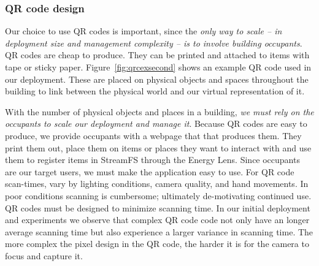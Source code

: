 




\subsubsection{QR code design}
\label{sec:qrc}
Our choice to use QR codes is important, since the \emph{only way to scale -- in deployment size and management complexity -- is to
involve building occupants}. QR codes are cheap to produce.  They can be printed and attached to items with tape or sticky paper.  
Figure~\ref{fig:qrcexsecond} shows an example QR code used in our deployment.  These are placed on physical
objects and spaces throughout the building to link between the physical world and our virtual representation of it.

With the number of physical objects and places in a building, \emph{we must rely on the occupants
to scale our deployment and manage it}. Because QR codes are easy to produce, we provide occupants with a webpage that
that produces them.  They print them out, place them on items or places they want to interact with and use them to register
items in StreamFS through the Energy Lens.
Since occupants are our target users, we must make the application easy to use.  For QR code scan-times, vary by lighting conditions, 
camera quality, and hand movements.  In poor conditions scanning is cumbersome; ultimately de-motivating continued use.  
QR codes must be designed to minimize scanning time.  In our initial deployment and experiments we observe
that complex QR code code not only have an longer average scanning time but also experience a larger variance in scanning time.  
The more complex the pixel design in the QR code, the harder it is for the camera to focus and capture it. 

